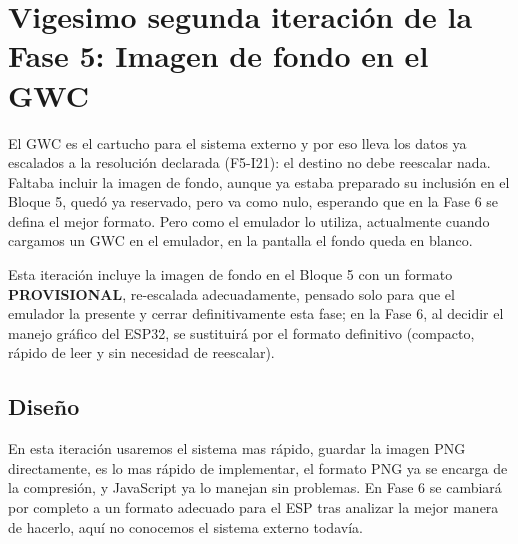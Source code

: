 \section{Vigesimo segunda iteración de la Fase 5: Imagen de fondo en el GWC}
\label{sec:F5I22}

El GWC es el cartucho para el sistema externo y por eso lleva los datos ya escalados a la resolución declarada (F5-I21): el destino no debe reescalar nada. Faltaba incluir la imagen de fondo, aunque ya estaba preparado su inclusión en el Bloque 5, quedó ya reservado, pero va como nulo, esperando que en la Fase 6 se defina el mejor formato. Pero como el emulador lo utiliza, actualmente cuando cargamos un GWC en el emulador, en la pantalla el fondo queda en blanco.

Esta iteración incluye la imagen de fondo en el Bloque 5 con un formato \textbf{PROVISIONAL}, re-escalada adecuadamente, pensado solo para que el emulador la presente y cerrar definitivamente esta fase; en la Fase 6, al decidir el manejo gráfico del ESP32, se sustituirá por el formato definitivo (compacto, rápido de leer y sin necesidad de reescalar).

\subsection{Diseño}
\label{sec:F5I22Diseno}

En esta iteración usaremos el sistema mas rápido, guardar la imagen PNG directamente, es lo mas rápido de implementar, el formato PNG ya se encarga de la compresión, y JavaScript ya lo manejan sin problemas. En Fase 6 se cambiará por completo a un formato  adecuado para el ESP tras analizar la mejor manera de hacerlo, aquí no conocemos el sistema externo todavía.

